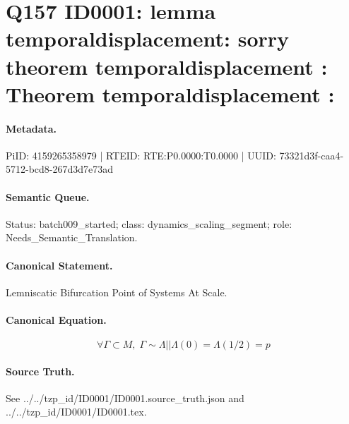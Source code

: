 \section*{Q157 ID0001: lemma temporaldisplacement: sorry theorem temporaldisplacement : Theorem temporaldisplacement :}
\paragraph{Metadata.}
PiID: 4159265358979 | RTEID: RTE:P0.0000:T0.0000 | UUID: 73321d3f-caa4-5712-bcd8-267d3d7e73ad

\paragraph{Semantic Queue.}
Status: batch009\_started; class: dynamics\_scaling\_segment; role: Needs\_Semantic\_Translation.

\paragraph{Canonical Statement.}
Lemniscatic Bifurcation Point of Systems At Scale.

\paragraph{Canonical Equation.}
\[
\forall \Gamma \subset M,\; \Gamma \sim \Lambda || \Lambda(0)=\Lambda(1/2)=p
\]

\paragraph{Source Truth.}
See ../../tzp\_id/ID0001/ID0001.source\_truth.json and ../../tzp\_id/ID0001/ID0001.tex.
